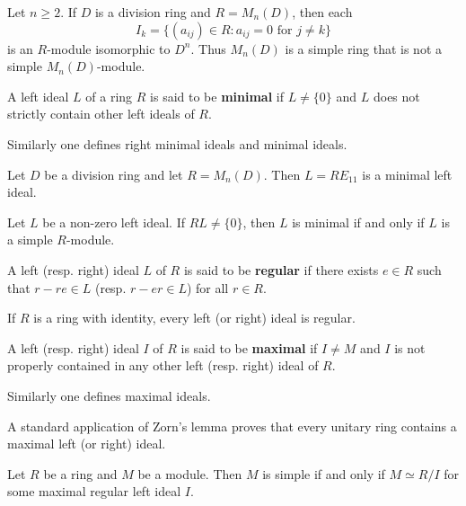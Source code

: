 \begin{example}
	\label{exa:I_k}
	Let $n\geq2$.  If $D$ is a division ring and $R=M_n(D)$, then each 
	\[
	I_k=\{ (a_{ij})\in R:a_{ij}=0\text{ for $j\ne k$}\}
	\]
	is an $R$-module isomorphic to $D^n$. 
	Thus $M_{n}(D)$ is a simple ring that is not a simple $M_n(D)$-module.
\end{example}

\begin{definition}
A left ideal $L$ of a ring $R$ is said to be \textbf{minimal} if $L\ne\{0\}$ and 
$L$ does not strictly contain other left ideals of $R$. 
\end{definition}

Similarly one defines
right minimal ideals and minimal ideals. 

\begin{example}
	Let $D$ be a division ring and let $R=M_n(D)$. Then $L=RE_{11}$ 
	is a minimal left ideal.
\end{example}

\begin{example}
	Let $L$ be a non-zero left ideal. If $RL\ne\{0\}$, then
	$L$ is minimal if and only if $L$ is a simple $R$-module. 
\end{example}

\begin{definition}
A left (resp. right) ideal $L$ of $R$ is said to be \textbf{regular} if
there exists $e\in R$ such that $r-re\in L$ (resp.  $r-er\in L$) for all $r\in R$.
\end{definition}

If $R$ is a ring with identity, every left (or right) ideal is regular. 

\begin{definition}
A left (resp. right) ideal $I$ of $R$ is said to be \textbf{maximal} if $I\ne M$ and $I$ is not properly contained 
in any other left (resp. right) ideal of $R$. 
\end{definition}

Similarly one defines maximal ideals. 

A standard
application of Zorn's lemma proves that every unitary ring contains a maximal left (or right) ideal.  


\begin{proposition}
	\label{proposition:R/I}
	Let $R$ be a ring and $M$ be a module. Then $M$ is simple if and only if
	$M\simeq R/I$ for some maximal regular left ideal $I$. 	
\end{proposition}

